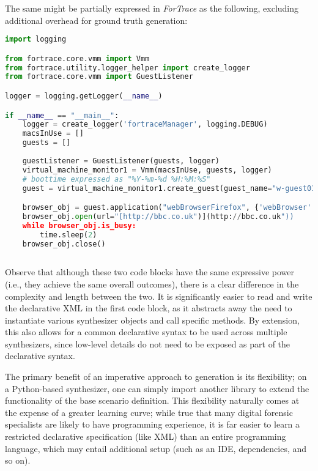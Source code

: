 The same might be partially expressed in \emph{ForTrace} as the
following, excluding additional overhead for ground truth generation:

\begin{lstlisting}[language=Python]
import logging

from fortrace.core.vmm import Vmm
from fortrace.utility.logger_helper import create_logger
from fortrace.core.vmm import GuestListener

logger = logging.getLogger(__name__)

if __name__ == "__main__":
    logger = create_logger('fortraceManager', logging.DEBUG)
    macsInUse = []
    guests = []
    
    guestListener = GuestListener(guests, logger)
    virtual_machine_monitor1 = Vmm(macsInUse, guests, logger)
    # boottime expressed as "%Y-%m-%d %H:%M:%S"
    guest = virtual_machine_monitor1.create_guest(guest_name="w-guest01", platform="windows", boottime="2013-01-01 13:14:00")

    browser_obj = guest.application("webBrowserFirefox", {'webBrowser': "firefox"})
    browser_obj.open(url="[http://bbc.co.uk")](http://bbc.co.uk"))
    while browser_obj.is_busy:
        time.sleep(2)
    browser_obj.close()
    
\end{lstlisting}

Observe that although these two code blocks have the same expressive
power (i.e., they achieve the same overall outcomes), there is a clear
difference in the complexity and length between the two. It is
significantly easier to read and write the declarative XML in the first
code block, as it abstracts away the need to instantiate various
synthesizer objects and call specific methods. By extension, this also
allows for a common declarative syntax to be used across multiple
synthesizers, since low-level details do not need to be exposed as part
of the declarative syntax.

The primary benefit of an imperative approach to generation is its
flexibility; on a Python-based synthesizer, one can simply import
another library to extend the functionality of the base scenario
definition. This flexibility naturally comes at the expense of a greater
learning curve; while true that many digital forensic specialists are
likely to have programming experience, it is far easier to learn a
restricted declarative specification (like XML) than an entire
programming language, which may entail additional setup (such as an IDE,
dependencies, and so on).

